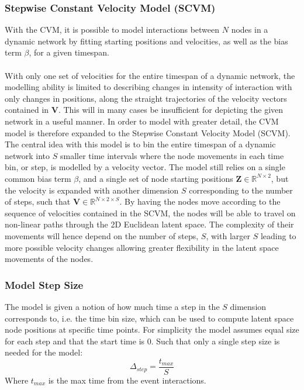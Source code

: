 \subsubsection{Stepwise Constant Velocity Model (SCVM)}
\label{sec:Method:ProposedModel:PiecewiseConstantVelocityModel}

With the CVM, it is possible to model interactions between $N$ nodes in a dynamic network by fitting starting positions and velocities, as well as the bias term $\beta$, for a given timespan.
\\\\
With only one set of velocities for the entire timespan of a dynamic network, the modelling ability is limited to describing changes in intensity of interaction with only changes in positions, along the straight trajectories of the velocity vectors contained in $\textbf{V}$.
This will in many cases be insufficient for depicting the given network in a useful manner. 
In order to model with greater detail, the CVM model is therefore expanded to the Stepwise Constant Velocity Model (SCVM). 
The central idea with this model is to bin the entire timespan of a dynamic network into $S$ smaller time intervals where the node movements in each time bin, or step, is modelled by a velocity vector. The model still relies on a single common bias term $\beta$, and a single set of node starting positions $\textbf{Z} \in \mathbb{R}^{N \times 2}$, but the velocity is expanded with another dimension $S$ corresponding to the number of steps, such that $\textbf{V} \in \mathbb{R}^{N \times 2 \times S}$.
By having the nodes move according to the sequence of velocities contained in the SCVM, the nodes will be able to travel on non-linear paths through the 2D Euclidean latent space.
The complexity of their movements will hence depend on the number of steps, $S$, with larger $S$ leading to more possible velocity changes allowing greater flexibility in the latent space movements of the nodes.

\subsubsection{Model Step Size}
The model is given a notion of how much time a step in the $S$ dimension corresponds to, i.e. the time bin size, which can be used to compute latent space node positions at specific time points. For simplicity the model assumes equal size for each step and that the start time is 0. Such that only a single step size is needed for the model:
\begin{equation}
    \Delta_{step} = \frac{t_{max}}{S}
\end{equation}
Where $t_{max}$ is the max time from the event interactions.

